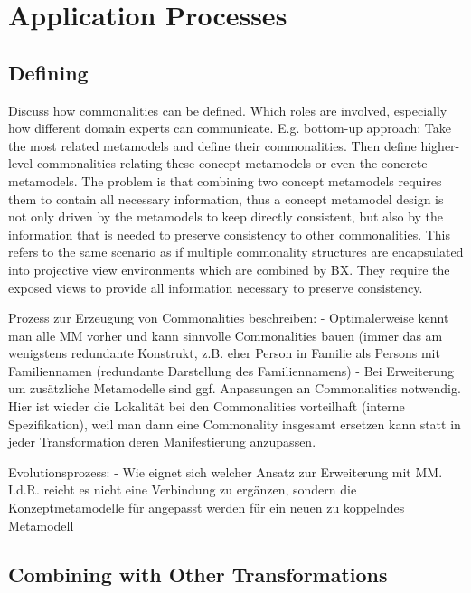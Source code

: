 \section{Application Processes}
\label{chap:improvement:application}

\subsection{Defining \commonalities}

Discuss how commonalities can be defined. Which roles are involved, especially how different domain experts can communicate. E.g. bottom-up approach: Take the most related metamodels and define their commonalities. Then define higher-level commonalities relating these concept metamodels or even the concrete metamodels. 
The problem is that combining two concept metamodels requires them to contain all necessary information, thus a concept metamodel design is not only driven by the metamodels to keep directly consistent, but also by the information that is needed to preserve consistency to other commonalities. This refers to the same scenario as if multiple commonality structures are encapsulated into projective view environments which are combined by BX. They require the exposed views to provide all information necessary to preserve consistency.


Prozess zur Erzeugung von Commonalities beschreiben:
- Optimalerweise kennt man alle MM vorher und kann sinnvolle Commonalities bauen (immer das am wenigstens redundante Konstrukt, z.B. eher Person in Familie als Persons mit Familiennamen (redundante Darstellung des Familiennamens)
- Bei Erweiterung um zusätzliche Metamodelle sind ggf. Anpassungen an Commonalities notwendig. Hier ist wieder die Lokalität bei den Commonalities vorteilhaft (interne Spezifikation), weil man dann eine Commonality insgesamt ersetzen kann statt in jeder Transformation deren Manifestierung anzupassen.

Evolutionsprozess:
- Wie eignet sich welcher Ansatz zur Erweiterung mit MM. I.d.R. reicht es nicht eine Verbindung zu ergänzen, sondern die Konzeptmetamodelle für angepasst werden für ein neuen zu koppelndes Metamodell



\subsection{Combining with Other Transformations}


